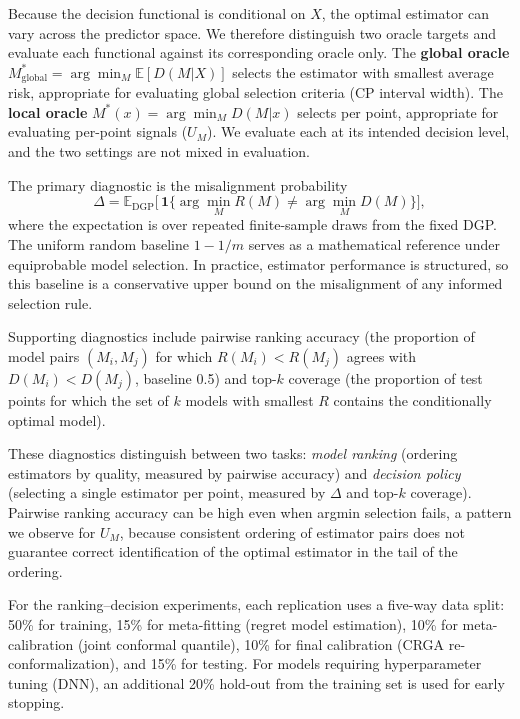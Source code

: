 \documentclass[a4paper,11pt]{article}
\begin{document}
Because the decision functional is conditional on $X$, the optimal estimator can vary across the predictor space. We therefore distinguish two oracle targets and evaluate each functional against its corresponding oracle only. The \textbf{global oracle} $M^\ast_{\text{global}} = \arg\min_M \mathbb{E}[D(M|X)]$ selects the estimator with smallest average risk, appropriate for evaluating global selection criteria (CP interval width). The \textbf{local oracle} $M^\ast(x) = \arg\min_M D(M|x)$ selects per point, appropriate for evaluating per-point signals ($U_M$). We evaluate each at its intended decision level, and the two settings are not mixed in evaluation.

The primary diagnostic is the misalignment probability
\begin{equation}
    \Delta = \mathbb{E}_{\text{DGP}}\bigl[\,\mathbf{1}\{\arg\min_{M} R(M) \neq \arg\min_{M} D(M)\}\bigr],
    \label{eq:delta}
\end{equation}
where the expectation is over repeated finite-sample draws from the fixed DGP. The uniform random baseline $1 - 1/m$ serves as a mathematical reference under equiprobable model selection. In practice, estimator performance is structured, so this baseline is a conservative upper bound on the misalignment of any informed selection rule.

Supporting diagnostics include pairwise ranking accuracy (the proportion of model pairs $(M_i, M_j)$ for which $R(M_i) < R(M_j)$ agrees with $D(M_i) < D(M_j)$, baseline 0.5) and top-$k$ coverage (the proportion of test points for which the set of $k$ models with smallest $R$ contains the conditionally optimal model).

These diagnostics distinguish between two tasks: \textit{model ranking} (ordering estimators by quality, measured by pairwise accuracy) and \textit{decision policy} (selecting a single estimator per point, measured by $\Delta$ and top-$k$ coverage). Pairwise ranking accuracy can be high even when argmin selection fails, a pattern we observe for $U_M$, because consistent ordering of estimator pairs does not guarantee correct identification of the optimal estimator in the tail of the ordering.

For the ranking--decision experiments, each replication uses a five-way data split: 50\% for training, 15\% for meta-fitting (regret model estimation), 10\% for meta-calibration (joint conformal quantile), 10\% for final calibration (CRGA re-conformalization), and 15\% for testing. For models requiring hyperparameter tuning (DNN), an additional 20\% hold-out from the training set is used for early stopping.
\end{document}
